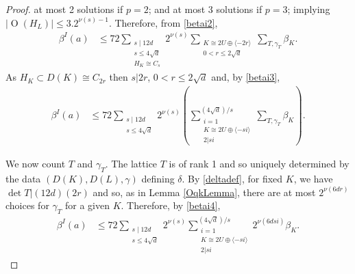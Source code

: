 \documentclass[12pt, a4paper]{article}
\newcommand{\la}{\langle}
\newcommand{\ra}{\rangle}
\newcommand{\opn}{\operatorname}
\newcommand{\op}{\oplus}
\begin{document}
\begin{proof}
    at most 2 solutions if $p=2$;
    and at most 3 solutions if $p=3$; 
    implying $\vert \opn{O}(H_L) \vert \leq 3. 2^{\nu(s) - 1}$.
Therefore, from \eqref{betai2},
    \begin{align}
      \beta^I(a)
      & \leq
      72 \sum_{\substack{s \mid 12d \\ s \leq 4 \sqrt{d} \\ H_K \cong C_s}} 2^{\nu(s)}
      \sum_{\substack{K \cong 2U \op \la -2r \ra \\ 0<r \leq 2 \sqrt{d}}}
      \sum_{T, \gamma_T} \beta_K. \label{betai3}
    \end{align}
    As $H_K \subset D(K) \cong C_{2r}$ then $s \vert 2r$, $0<r\leq 2 \sqrt{d}$ and, by \eqref{betai3},
    \begin{align}
      \beta^I(a)
      & \leq
      72 \sum_{\substack{s \mid 12d \\ s \leq 4 \sqrt{d}}} 2^{\nu(s)}
      \left (
      \sum_{\substack{i=1 \\ K \cong 2U \op \la -si \ra \\ 2 \vert si}}^{(4 \sqrt{d})/s}
      \sum_{T, \gamma_T} \beta_K
      \right ). \label{betai4}
    \end{align}

    We now count $T$ and $\gamma_T$.
    The lattice $T$ is of rank 1 and so uniquely determined by the data $(D(K), D(L), \gamma)$ defining $\delta$.
    By \eqref{deltadef}, for fixed $K$, we have $\opn{det} T \vert (12d)(2r)$ and so, as in Lemma \ref{OqkLemma}, there are at most $2^{\nu(6dr)}$ choices for $\gamma_T$ for a given $K$.
    Therefore, by \eqref{betai4},
    \begin{align}
      \beta^I(a)
      & \leq
      72 \sum_{\substack{s \mid 12d \\ s \leq 4 \sqrt{d}}} 2^{\nu(s)}
      \sum_{\substack{i=1 \\ K \cong 2U \op \la -si \ra \\ 2 \vert si }}^{(4 \sqrt{d})/s}
      2^{\nu(6dsi)} \beta_K. \label{betai5}
    \end{align}
    

\end{proof}
\end{document}
